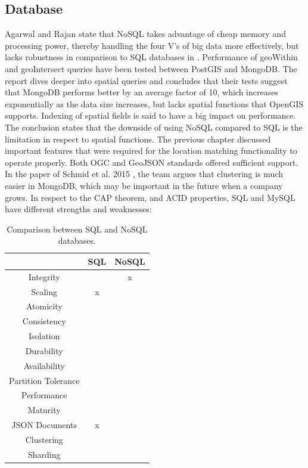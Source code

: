 \subsection{Database}
Agarwal and Rajan state that NoSQL takes advantage of cheap memory and processing power, thereby handling the four V’s of big data more effectively, but lacks robustness in comparison to SQL databases in \cite{AGS}. Performance of geoWithin and geoIntersect queries have been tested between PostGIS and MongoDB. The report dives deeper into spatial queries and concludes that their tests suggest that MongoDB performs better by an average factor of 10, which increases exponentially as the data size increases, but lacks spatial functions that OpenGIS supports. Indexing of spatial fields is said to have a big impact on performance. The conclusion states that the downside of using NoSQL compared to SQL is the limitation in respect to spatial functions. The previous chapter discussed important features that were required for the location matching functionality to operate properly. Both OGC and GeoJSON standards offered sufficient support. In the paper of Schmid et al. 2015 \cite{SCS}, the team argues that clustering is much easier in MongoDB, which may be important in the future when a company grows. In respect to the CAP theorem, and ACID properties, SQL and MySQL have different strengths and weaknesses:

\begin{table}[htbp!]
	\centering
	\begin{tabular}{c|c|c}
		\toprule
		& SQL & NoSQL \\
		\midrule
		Integrity & \checkmark\checkmark & x \\
		Scaling & x & \checkmark\checkmark \\
		Atomicity & \checkmark & \checkmark \\
		Consistency & \checkmark\checkmark & \checkmark \\
		Isolation & \checkmark & \checkmark \\
		Durability & \checkmark & \checkmark \\
		Availability & \checkmark & \checkmark\checkmark \\
		Partition Tolerance & \checkmark & \checkmark \\
		Performance & \checkmark & \checkmark\checkmark \\
		Maturity & \checkmark\checkmark & \checkmark \\
		JSON Documents & x & \checkmark \\
		Clustering & \checkmark & \checkmark \\
		Sharding & \checkmark & \checkmark\checkmark \\
		\bottomrule
	\end{tabular}
	\caption[Databases Comparison]{Comparison between SQL and NoSQL databases.}
	\label{tab:databases-comparison}
\end{table}

